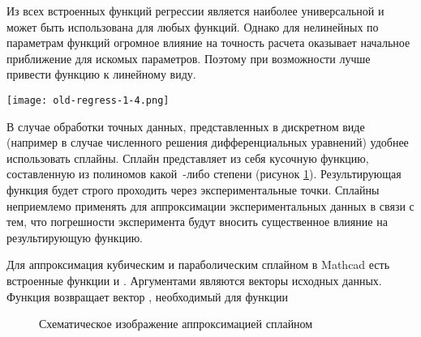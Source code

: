 Из всех встроенных функций регрессии  является наиболее универсальной и может быть использована для любых функций. Однако для нелинейных по параметрам функций огромное влияние на точность расчета оказывает начальное приближение   для искомых параметров. Поэтому при возможности лучше привести функцию к линейному виду.
 

\begin{center}
	\texttt{[image: old-regress-1-4.png]}
\end{center}

В случае обработки точных данных, представленных в дискретном виде (например в случае численного решения дифференциальных уравнений) удобнее использовать сплайны. Сплайн представляет из себя кусочную функцию, составленную из полиномов какой~-либо степени (рисунок \ref{fig:old.regress.spline}). Результирующая функция будет строго проходить через экспериментальные точки. Сплайны неприемлемо применять для аппроксимации экспериментальных данных в связи с тем, что погрешности эксперимента будут вносить существенное влияние на результирующую функцию.

Для аппроксимация кубическим и параболическим сплайном в Mathcad есть встроенные функции  и . Аргументами являются векторы исходных данных. Функция возвращает вектор , необходимый для функции 

\begin{figure}[h] %
	\begin{center} 
	\end{center}
	\caption{Схематическое изображение аппроксимацией сплайном}\label{fig:old.regress.spline}
\end{figure}


